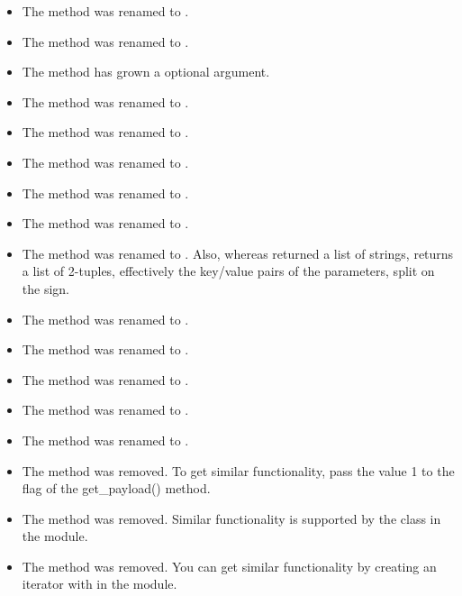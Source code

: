 \begin{itemize}
\item The method  was renamed to .
\item The method  was renamed to
      .
\item The  method has grown a 
      optional argument.
\item The method  was renamed to .
\item The method  was renamed to .
\item The method  was renamed to .
\item The method was renamed to
      .
\item The method  was renamed to
      .
\item The method  was renamed to
      .
      Also, whereas  returned a list of strings,
       returns a list of 2-tuples, effectively
      the key/value pairs of the parameters, split on the \samp{=}
      sign.
\item The method  was renamed to .
\item The method  was renamed to
      .
\item The method  was renamed to
      .
\item The method  was renamed to
      .
\item The method  was renamed to
      .
\item The method  was removed.  To get
      similar functionality, pass the value 1 to the  flag
      of the {get_payload()} method.
\item The method  was removed.  Similar
      functionality
      is supported by the  class in the
       module.
\item The method  was removed.  You can get
      similar functionality by creating an iterator with
       in the
       module.
\end{itemize}

